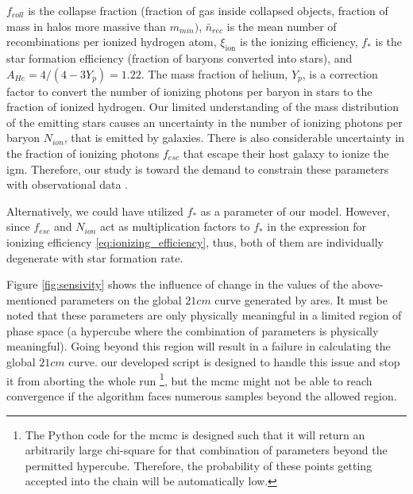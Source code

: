 \documentclass[12pt, TexShade, letterpaper]{report}
\begin{document}
\begin{enumerate}
    $f_{coll}$ is the collapse fraction (fraction of gas inside collapsed objects, fraction of mass in halos more massive than $m_{min})$, $\bar{n}_{rec}$ is the mean number of recombinations per ionized hydrogen atom, $\xi_{\text{ion}}$ is the ionizing efficiency, $f_*$ is the star formation efficiency (fraction of baryons converted into stars), and $A_{He} = 4/(4 - 3Y_p) = 1.22$. The mass fraction of helium, $Y_p$, is a correction factor to convert the number of ionizing photons per baryon in stars to the fraction of ionized hydrogen. Our limited understanding of the mass distribution of the emitting stars causes an uncertainty in the number of ionizing photons per baryon $N_{ion}$, that is emitted by galaxies. There is also considerable uncertainty in the fraction of ionizing photons $f_{esc}$ that escape their host galaxy to ionize the \gls{igm}. Therefore, our study is toward the demand to constrain these parameters with observational data \cite{low_frequency, 21century}.\par
    Alternatively, we could have utilized $f_*$ as a parameter of our model. However, since $f_{esc}$ and $N_{ion}$ act as multiplication factors to $f_*$ in the expression for ionizing efficiency \ref{eq:ionizing_efficiency}, thus, both of them are individually degenerate with star formation rate.
\end{enumerate}
Figure \ref{fig:sensivity} shows the influence of change in the values of the above-mentioned parameters on the global $21cm$ curve generated by \gls{ares}. It must be noted that these parameters are only physically meaningful in a limited region of phase space (a hypercube where the combination of parameters is physically meaningful). Going beyond this region will result in a failure in calculating the global $21cm$ curve. our developed script is designed to handle this issue and stop it from aborting the whole run \footnote{The Python code for the \gls{mcmc} is designed such that it will return an arbitrarily large chi-square for that combination of parameters beyond the permitted hypercube. Therefore, the probability of these points getting accepted into the chain will be automatically low.}, but the \gls{mcmc} might not be able to reach convergence if the algorithm faces numerous samples beyond the allowed region.\par
\end{document}

